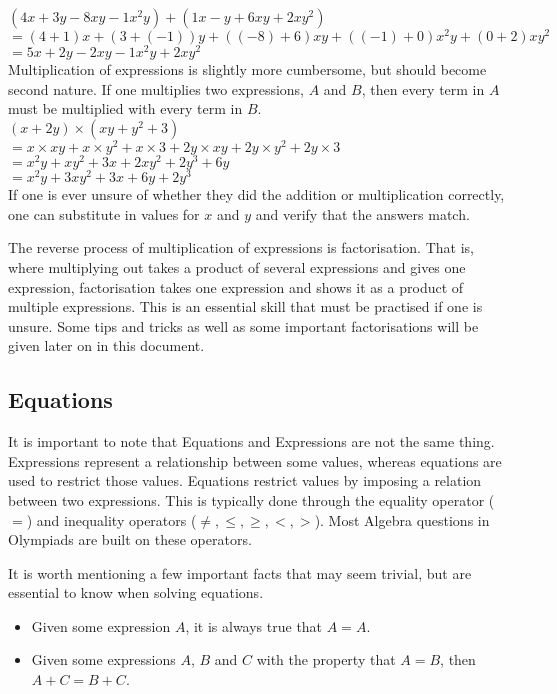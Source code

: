 \documentclass[a4paper,12pt]{article}
\begin{document}
$(4x + 3y - 8xy - 1x^2y) + (1x - y + 6xy + 2xy^2)$ \\
$= (4 + 1)x + (3 + (-1))y + ((-8) + 6)xy + ((-1) + 0)x^2y + (0 + 2)xy^2$ \\
$= 5x + 2y - 2xy - 1x^2y + 2xy^2$ \\

Multiplication of expressions is slightly more cumbersome, but should become second nature. If one multiplies two expressions, $A$ and $B$, then every term in $A$ must be multiplied with every term in $B$. \\

$ (x + 2y) \times (xy + y^2 + 3) $ \\
$= x \times xy + x \times y^2 + x \times 3 + 2y \times xy + 2y \times y^2 + 2y \times 3 $ \\
$= x^2y + xy^2 + 3x + 2xy^2 + 2y^3 + 6y$ \\
$= x^2y + 3xy^2 + 3x + 6y + 2y^3$ \\

If one is ever unsure of whether they did the addition or multiplication correctly, one can substitute in values for $x$ and $y$ and verify that the answers match.

The reverse process of multiplication of expressions is factorisation. That is, where multiplying out takes a product of several expressions and gives one expression, factorisation takes one expression and shows it as a product of multiple expressions. This is an essential skill that must be practised if one is unsure. Some tips and tricks as well as some important factorisations will be given later on in this document.


\subsection{Equations}
It is important to note that Equations and Expressions are not the same thing. Expressions represent a relationship between some values, whereas equations are used to restrict those values. Equations restrict values by imposing a relation between two expressions. This is typically done through the equality operator ($=$) and inequality operators ($\neq, \leq, 
\geq, <, >$). Most Algebra questions in Olympiads are built on these operators.

It is worth mentioning a few important facts that may seem trivial, but are essential to know when solving equations.
\begin{itemize}
\item Given some expression $A$, it is always true that $A = A$.
\item Given some expressions $A$, $B$ and $C$ with the property that $A = B$, then $A + C = B + C$.
\end{itemize}
\end{document}

